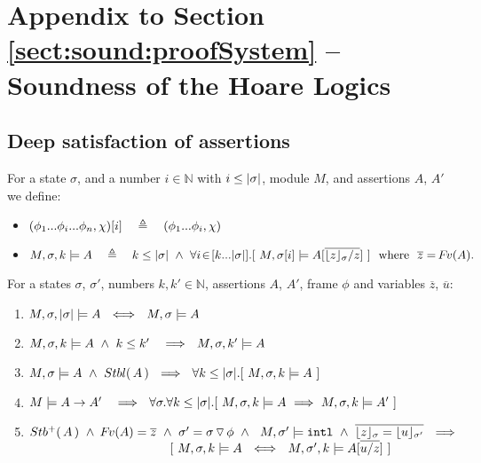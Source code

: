 
\section{Appendix to Section \ref{sect:sound:proofSystem} -- Soundness of the Hoare Logics}

\subsection{Deep satisfaction of assertions}
\label{s:deep:mean}{

\begin{definition}%
\label{def:restrict}
For a state $\sigma$, and a number $i\in \mathbb{N}$ with $i \leq |\sigma|$,   module $M$, and assertions $A$, $A'$ we define: %
\begin{itemize}
\item
 $\RestictTo {(\phi_1...\phi_i...\phi_n,\chi)} {i}\ \ \ \triangleq \ \ \ (\phi_1...\phi_i,\chi)$
\item
$  \satDAssertFrom M  \sigma k   A  \ \  \ \triangleq \  \ \  
  k\leq  \DepthSt {\sigma} \ \wedge \  \forall i\!\in\![k...\DepthSt {\sigma}].[\ M,{\RestictTo {\sigma}{i}} \models A[\overline{ {{\interpret \sigma z}/ z}}]\ ] \ \  \mbox{where} \ \
  \overline z=\fv(A).$ 
\end{itemize}
\end{definition}
 
  
 
\begin{lemma}
\label{l:shallow:deep}
For a states $\sigma$, $\sigma'$, numbers $k,k'\in \mathbb{N}$, assertions  $A$, $A'$, frame $\phi$ and variables $\overline z$, $\overline u$:
\begin{enumerate}
\item
$ \satDAssertFrom M  \sigma { \DepthSt \sigma}   A \ \ \Longleftrightarrow\ \ M,\sigma \models A\ $
\item
$ \satDAssertFrom M  \sigma {k} A \ \wedge\  k\leq k'\  \  \   \Longrightarrow \ \ \satDAssertFrom M  \sigma {k'} A$ 
\item 
\label{shallow:to:deep}
$ M,\sigma \models A \ \wedge\ \Stable A \  \ \Longrightarrow \  \  \forall k  \leq  \DepthSt \sigma.[ \ \satDAssertFrom M  \sigma k   A \ ]$
\item
\label{fourSD}
$ M  \models A \rightarrow A'\  \  \   \Longrightarrow \ \ \forall \sigma. \forall k\leq  { \DepthSt \sigma}.[ \ \satDAssertFrom M  \sigma {k} A
\ \Longrightarrow \  \satDAssertFrom M  \sigma {k} A'\ ]$
\item
\label{fiveSD}
$\Pos A \ \wedge\ \fv(A)=\overline z\ \wedge\ \sigma'=\sigma  \pushSymbol \phi\ \wedge\ \ M, \sigma' \models \intThis \ \wedge\   \overline {\interpret \sigma z= {\interpret {\sigma'} u}}\ \ \Longrightarrow$ \\
$\strut \hspace{4cm} [\ \satDAssertFrom M  \sigma {k} A  
\ \ \Longleftrightarrow \ \ \satDAssertFrom M  {\sigma'} {k} {A[{\overline{u/z}}]}\ ]$
\end{enumerate}
\end{lemma}
 
}

